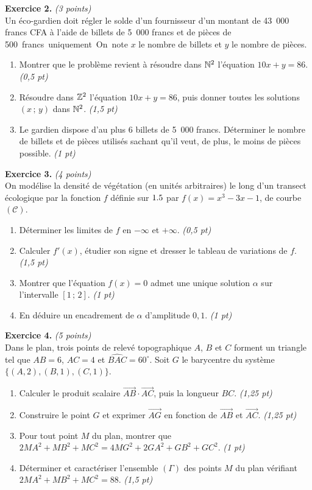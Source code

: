 \smallskip
\noindent\textbf{Exercice 2.} \hfill\textit{(3 points)}\\
Un éco-gardien doit régler le solde d'un fournisseur d'un montant de
\SI{43}{000} francs CFA à l'aide de billets de \SI{5}{000} francs et de pièces de
\SI{500} francs uniquement. On note $x$ le nombre de billets et $y$ le nombre de
pièces.
\begin{enumerate}[label=\arabic*)]
\item Montrer que le problème revient à résoudre dans $\mathbb{N}^2$ l'équation
$10x+y=86$. \hfill\textit{(0,5 pt)}
\item Résoudre dans $\mathbb{Z}^2$ l'équation $10x+y=86$, puis donner toutes les solutions
$(x\,;\,y)$ dans $\mathbb{N}^2$. \hfill\textit{(1,5 pt)}
\item Le gardien dispose d'au plus $6$ billets de \SI{5}{000} francs. Déterminer
le nombre de billets et de pièces utilisés sachant qu'il veut, de plus, le moins
de pièces possible. \hfill\textit{(1 pt)}
\end{enumerate}

\smallskip
\noindent\textbf{Exercice 3.} \hfill\textit{(4 points)}\\
On modélise la densité de végétation (en unités arbitraires) le long d'un transect
écologique par la fonction $f$ définie sur $1.5$ par
$f(x)=x^3-3x-1$, de courbe $(\mathcal{C})$.
\begin{enumerate}[label=\arabic*)]
\item Déterminer les limites de $f$ en $-\infty$ et $+\infty$. \hfill\textit{(0,5 pt)}
\item Calculer $f'(x)$, étudier son signe et dresser le tableau de variations de
$f$. \hfill\textit{(1,5 pt)}
\item Montrer que l'équation $f(x)=0$ admet une unique solution $\alpha$ sur
l'intervalle $[1\,;\,2]$. \hfill\textit{(1 pt)}
\item En déduire un encadrement de $\alpha$ d'amplitude $0{,}1$. \hfill\textit{(1 pt)}
\end{enumerate}

\smallskip
\noindent\textbf{Exercice 4.} \hfill\textit{(5 points)}\\
Dans le plan, trois points de relevé topographique $A$, $B$ et $C$ forment un
triangle tel que $AB=6$, $AC=4$ et $\widehat{BAC}=60^\circ$. Soit $G$ le barycentre
du système $\{(A,2),(B,1),(C,1)\}$.
\begin{enumerate}[label=\arabic*)]
\item Calculer le produit scalaire $\overrightarrow{AB}\cdot\overrightarrow{AC}$,
puis la longueur $BC$. \hfill\textit{(1,25 pt)}
\item Construire le point $G$ et exprimer $\overrightarrow{AG}$ en fonction de
$\overrightarrow{AB}$ et $\overrightarrow{AC}$. \hfill\textit{(1,25 pt)}
\item Pour tout point $M$ du plan, montrer que
$2MA^2+MB^2+MC^2=4MG^2+2GA^2+GB^2+GC^2$. \hfill\textit{(1 pt)}
\item Déterminer et caractériser l'ensemble $(\Gamma)$ des points $M$ du plan
vérifiant $2MA^2+MB^2+MC^2=88$. \hfill\textit{(1,5 pt)}
\end{enumerate}


